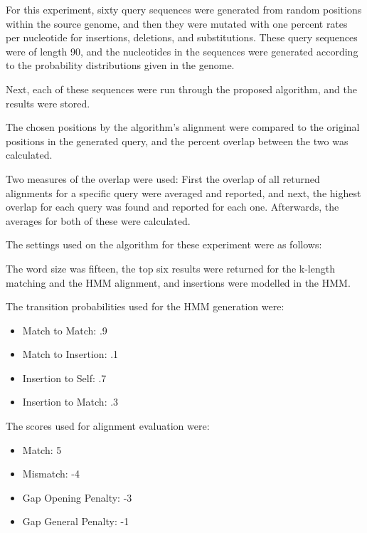 \documentclass[12pt, conference]{IEEEtran}
\begin{document}
    For this experiment, sixty query sequences were generated from random positions within the source genome, and then they were mutated with one percent rates per nucleotide for insertions, deletions, and substitutions. 
    These query sequences were of length 90, and the nucleotides in the sequences were generated according to the probability distributions given in the genome.

    Next, each of these sequences were run through the proposed algorithm, and the results were stored.

    The chosen positions by the algorithm's alignment were compared to the original positions in the generated query, and the percent overlap between the two was calculated.

    Two measures of the overlap were used: 
    First the overlap of all returned alignments for a specific query were averaged and reported, and next, the highest overlap for each query was found and reported for each one. Afterwards, the averages for both of these were calculated.

    The settings used on the algorithm for these experiment were as follows:

    The word size was fifteen, the top six results were returned for the k-length matching and the HMM alignment, and insertions were modelled in the HMM.

    The transition probabilities used for the HMM generation were:
    
    \begin{itemize}
    
        \item Match to Match: .9

        \item Match to Insertion: .1

        \item Insertion to Self: .7

        \item Insertion to Match: .3

    \end{itemize}

    The scores used for alignment evaluation were:
    
    \begin{itemize}
        \item Match: 5

        \item Mismatch: -4

        \item Gap Opening Penalty: -3

        \item Gap General Penalty: -1
    \end{itemize}
\end{document}
